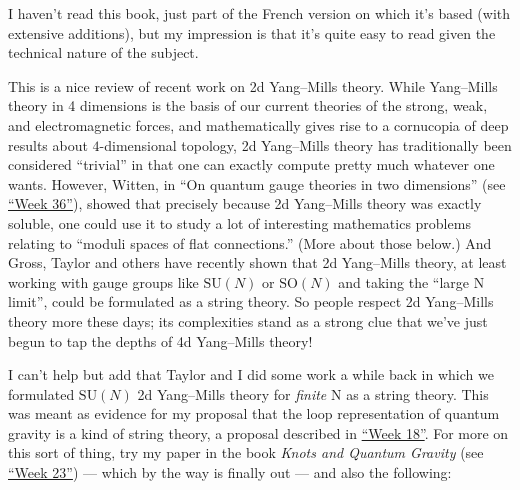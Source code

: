 \documentclass{article}
\def\tightlist{}
\renewcommand{\texttt}[1]{%
  \begingroup
  \ttfamily
  \begingroup\lccode`~=`/\lowercase{\endgroup\def~}{/\discretionary{}{}{}}%
  \begingroup\lccode`~=`[\lowercase{\endgroup\def~}{[\discretionary{}{}{}}%
  \begingroup\lccode`~=`.\lowercase{\endgroup\def~}{.\discretionary{}{}{}}%
  \catcode`/=\active\catcode`[=\active\catcode`.=\active
  \scantokens{#1\noexpand}%
  \endgroup
}
\begin{document}
I haven't read this book, just part of the French version on which it's
based (with extensive additions), but my impression is that it's quite
easy to read given the technical nature of the subject.


This is a nice review of recent work on 2d Yang--Mills theory. While
Yang--Mills theory in 4 dimensions is the basis of our current theories
of the strong, weak, and electromagnetic forces, and mathematically
gives rise to a cornucopia of deep results about \(4\)-dimensional
topology, 2d Yang--Mills theory has traditionally been considered
``trivial'' in that one can exactly compute pretty much whatever one
wants. However, Witten, in ``On quantum gauge theories in two
dimensions'' (see \protect\hyperlink{week36}{``Week 36''}), showed that
precisely because 2d Yang--Mills theory was exactly soluble, one could
use it to study a lot of interesting mathematics problems relating to
``moduli spaces of flat connections.'' (More about those below.) And
Gross, Taylor and others have recently shown that 2d Yang--Mills theory,
at least working with gauge groups like \(\mathrm{SU}(N)\) or
\(\mathrm{SO}(N)\) and taking the ``large N limit'', could be formulated
as a string theory. So people respect 2d Yang--Mills theory more these
days; its complexities stand as a strong clue that we've just begun to
tap the depths of 4d Yang--Mills theory!

I can't help but add that Taylor and I did some work a while back in
which we formulated \(\mathrm{SU}(N)\) 2d Yang--Mills theory for
\emph{finite} N as a string theory. This was meant as evidence for my
proposal that the loop representation of quantum gravity is a kind of
string theory, a proposal described in \protect\hyperlink{week18}{``Week
18''}. For more on this sort of thing, try my paper in the book
\emph{Knots and Quantum Gravity} (see \protect\hyperlink{week23}{``Week
23''}) --- which by the way is finally out --- and also the following:

\end{document}
